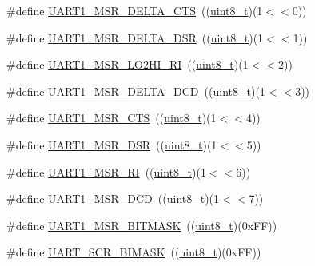 \begin{DoxyCompactItemize}
\item 
\#define \hyperlink{group___u_a_r_t___private___macros_ga2bb22876f02e34aa21bcd162cea55efb}{U\+A\+R\+T1\+\_\+\+M\+S\+R\+\_\+\+D\+E\+L\+T\+A\+\_\+\+C\+TS}~((\hyperlink{_p_e___types_8h_aba7bc1797add20fe3efdf37ced1182c5}{uint8\+\_\+t})(1$<$$<$0))
\item 
\#define \hyperlink{group___u_a_r_t___private___macros_gac3d680cc21ada710ed81abb0ed9a1a4f}{U\+A\+R\+T1\+\_\+\+M\+S\+R\+\_\+\+D\+E\+L\+T\+A\+\_\+\+D\+SR}~((\hyperlink{_p_e___types_8h_aba7bc1797add20fe3efdf37ced1182c5}{uint8\+\_\+t})(1$<$$<$1))
\item 
\#define \hyperlink{group___u_a_r_t___private___macros_ga36bbd609452b3c026fa804fcd13a86c0}{U\+A\+R\+T1\+\_\+\+M\+S\+R\+\_\+\+L\+O2\+H\+I\+\_\+\+RI}~((\hyperlink{_p_e___types_8h_aba7bc1797add20fe3efdf37ced1182c5}{uint8\+\_\+t})(1$<$$<$2))
\item 
\#define \hyperlink{group___u_a_r_t___private___macros_ga8fb22a29caf2b5ca74022ea9f0a90185}{U\+A\+R\+T1\+\_\+\+M\+S\+R\+\_\+\+D\+E\+L\+T\+A\+\_\+\+D\+CD}~((\hyperlink{_p_e___types_8h_aba7bc1797add20fe3efdf37ced1182c5}{uint8\+\_\+t})(1$<$$<$3))
\item 
\#define \hyperlink{group___u_a_r_t___private___macros_gae33cbb3bfc95dfa93e011c08057aa58c}{U\+A\+R\+T1\+\_\+\+M\+S\+R\+\_\+\+C\+TS}~((\hyperlink{_p_e___types_8h_aba7bc1797add20fe3efdf37ced1182c5}{uint8\+\_\+t})(1$<$$<$4))
\item 
\#define \hyperlink{group___u_a_r_t___private___macros_ga30f158b6d377a4ce3720d4ce6864abd3}{U\+A\+R\+T1\+\_\+\+M\+S\+R\+\_\+\+D\+SR}~((\hyperlink{_p_e___types_8h_aba7bc1797add20fe3efdf37ced1182c5}{uint8\+\_\+t})(1$<$$<$5))
\item 
\#define \hyperlink{group___u_a_r_t___private___macros_gad2a5a9572d8e00d40add31ca00264d74}{U\+A\+R\+T1\+\_\+\+M\+S\+R\+\_\+\+RI}~((\hyperlink{_p_e___types_8h_aba7bc1797add20fe3efdf37ced1182c5}{uint8\+\_\+t})(1$<$$<$6))
\item 
\#define \hyperlink{group___u_a_r_t___private___macros_gad420620d318c71094a74ba44b1ce3483}{U\+A\+R\+T1\+\_\+\+M\+S\+R\+\_\+\+D\+CD}~((\hyperlink{_p_e___types_8h_aba7bc1797add20fe3efdf37ced1182c5}{uint8\+\_\+t})(1$<$$<$7))
\item 
\#define \hyperlink{group___u_a_r_t___private___macros_gaa25ca1b2a81d8ee9d9aad9cafdd04668}{U\+A\+R\+T1\+\_\+\+M\+S\+R\+\_\+\+B\+I\+T\+M\+A\+SK}~((\hyperlink{_p_e___types_8h_aba7bc1797add20fe3efdf37ced1182c5}{uint8\+\_\+t})(0x\+F\+F))
\item 
\#define \hyperlink{group___u_a_r_t___private___macros_ga055f27dcd4a5664ffec09bf024e19120}{U\+A\+R\+T\+\_\+\+S\+C\+R\+\_\+\+B\+I\+M\+A\+SK}~((\hyperlink{_p_e___types_8h_aba7bc1797add20fe3efdf37ced1182c5}{uint8\+\_\+t})(0x\+F\+F))

\end{DoxyCompactItemize}
